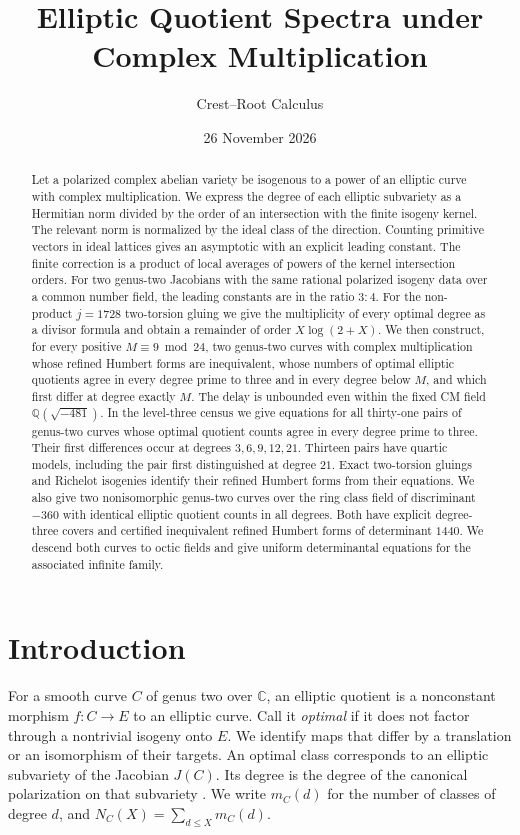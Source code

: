 \documentclass[11pt,letterpaper]{amsart}
\title[Elliptic quotient spectra under complex multiplication]{Elliptic Quotient Spectra under Complex Multiplication}
\author{Crest--Root Calculus}
\date{26 November 2026}
\theoremstyle{definition}
\numberwithin{equation}{section}
\newcommand{\Q}{\mathbb Q}
\newcommand{\C}{\mathbb C}
\begin{document}
\begin{abstract}
Let a polarized complex abelian variety be isogenous to a power of an
elliptic curve with complex multiplication. We express the degree of
each elliptic subvariety as a Hermitian norm divided by the order of an
intersection with the finite isogeny kernel. The relevant norm is
normalized by the ideal class of the direction. Counting primitive
vectors in ideal lattices gives an asymptotic with an explicit leading
constant. The finite correction is a product of local averages of
powers of the kernel intersection orders. For two genus-two Jacobians
with the same rational polarized isogeny data over a common number
field, the leading constants are in the ratio \(3:4\). For the
non-product \(j=1728\) two-torsion gluing we give the multiplicity of
every optimal degree as a divisor formula and obtain a remainder of
order \(X\log(2+X)\). We then construct, for every positive \(M\equiv9\bmod24\),
two genus-two curves with complex multiplication whose refined Humbert
forms are inequivalent, whose numbers of optimal elliptic quotients
agree in every degree prime to three and in every degree below \(M\),
and which first differ at degree exactly \(M\). The delay is unbounded
even within the fixed CM field \(\Q(\sqrt{-481})\). In the level-three
census we give equations for all thirty-one pairs of genus-two curves
whose optimal quotient counts agree in every degree prime to three.
Their first differences occur at degrees \(3,6,9,12,21\).
Thirteen pairs have quartic models, including the pair first distinguished
at degree \(21\). Exact two-torsion gluings and Richelot isogenies
identify their refined Humbert forms from their equations. We also give
two nonisomorphic genus-two curves over the ring class field of
discriminant \(-360\) with identical elliptic quotient counts in all
degrees. Both have explicit degree-three covers and certified inequivalent
refined Humbert forms of determinant \(1440\). We descend both curves
to octic fields and give uniform determinantal equations for the
associated infinite family.
\end{abstract}
\maketitle

\section{Introduction}

For a smooth curve \(C\) of genus two over \(\C\), an elliptic quotient
is a nonconstant morphism \(f:C\to E\) to an elliptic curve. Call it
\emph{optimal} if it does not factor through a nontrivial isogeny onto
\(E\). We identify maps that differ by a translation or an isomorphism
of their targets. An optimal class corresponds to an elliptic
subvariety of the Jacobian \(J(C)\). Its degree is the degree of the
canonical polarization on that subvariety
\cite{KaniI,KaniII,Guerra19}. We write \(m_C(d)\) for the number of
classes of degree \(d\), and \(N_C(X)=\sum_{d\le X}m_C(d)\).
\end{document}
